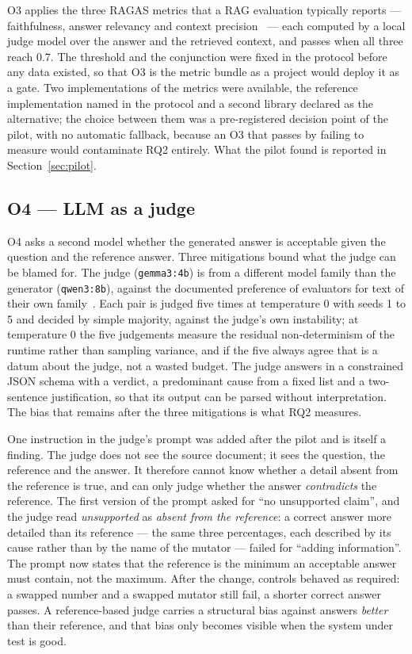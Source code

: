 \documentclass[a4paper,fleqn]{cas-dc}
\newcommand{\code}[1]{\texttt{#1}}
\begin{document}
O3 applies the three RAGAS metrics that a RAG evaluation typically reports
--- faithfulness, answer relevancy and context precision~\cite{es2024ragas} ---
each computed by a local judge model over the answer and the retrieved
context, and passes when all three reach 0.7. The threshold and the
conjunction were fixed in the protocol before any data existed, so that O3 is
the metric bundle as a project would deploy it as a gate. Two implementations of
the metrics were available, the reference implementation named in the protocol
and a second library declared as the alternative; the choice between them was a
pre-registered decision point of the pilot, with no automatic fallback, because
an O3 that passes by failing to measure would contaminate RQ2 entirely. What
the pilot found is reported in Section~\ref{sec:pilot}.

\subsection{O4 --- LLM as a judge}
\label{sec:o4}

O4 asks a second model whether the generated answer is acceptable given the
question and the reference answer. Three mitigations bound what the judge can
be blamed for. The judge (\code{gemma3:4b}) is from a different model family
than the generator (\code{qwen3:8b}), against the documented preference of
evaluators for text of their own family~\cite{panickssery2024llm}. Each pair is
judged five times at temperature 0 with seeds 1 to 5 and decided by simple
majority, against the judge's own instability; at temperature 0 the five
judgements measure the residual non-determinism of the runtime rather than
sampling variance, and if the five always agree that is a datum about the
judge, not a wasted budget. The judge answers in a constrained JSON schema with
a verdict, a predominant cause from a fixed list and a two-sentence
justification, so that its output can be parsed without interpretation. The
bias that remains after the three mitigations is what RQ2 measures.

One instruction in the judge's prompt was added after the pilot and is itself
a finding. The judge does not see the source document; it sees the question,
the reference and the answer. It therefore cannot know whether a detail absent
from the reference is true, and can only judge whether the answer
\emph{contradicts} the reference. The first version of the prompt asked for
``no unsupported claim'', and the judge read \emph{unsupported} as \emph{absent
from the reference}: a correct answer more detailed than its reference --- the
same three percentages, each described by its cause rather than by the name of
the mutator --- failed for ``adding information''. The prompt now states that
the reference is the minimum an acceptable answer must contain, not the
maximum. After the change, controls behaved as required: a swapped number and
a swapped mutator still fail, a shorter correct answer passes. A reference-based
judge carries a structural bias against answers \emph{better} than their
reference, and that bias only becomes visible when the system under test is
good.
\end{document}
